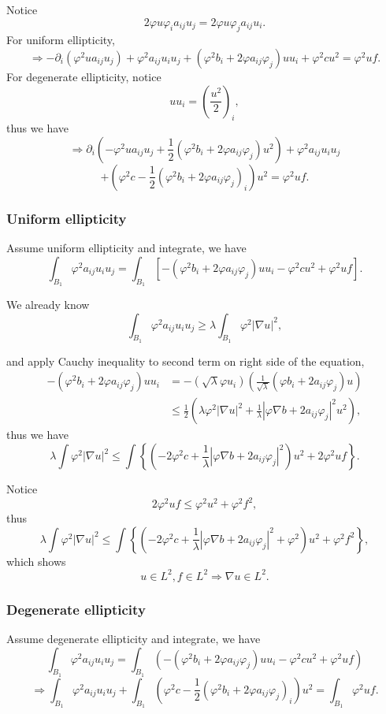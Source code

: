 \documentclass[12pt]{article}
\begin{document}
Notice
\[ 2\varphi u\varphi_ia_{ij}u_j=2\varphi u\varphi_ja_{ij}u_i. \]
For uniform ellipticity,
\[ \Rightarrow -\partial_i\left(\varphi^2ua_{ij}u_j\right)+\varphi^2a_{ij}u_iu_j + \left(\varphi^2b_i+2\varphi a_{ij}\varphi_j\right)uu_i+\varphi^2cu^2=\varphi^2uf. \]
For degenerate ellipticity, notice
\[ uu_i=\left(\frac{u^2}{2}\right)_i, \]
thus we have
\[ \Rightarrow \partial_i\left(-\varphi^2ua_{ij}u_j+\frac{1}{2}\left(\varphi^2b_i+2\varphi a_{ij}\varphi_j\right)u^2\right)+\varphi^2a_{ij}u_iu_j\]
\[+\left(\varphi^2c-\frac{1}{2}\left(\varphi^2b_i+2\varphi a_{ij}\varphi_j\right)_i\right)u^2=\varphi^2uf. \]

\subsubsection{Uniform ellipticity}
Assume uniform ellipticity and integrate, we have
\[ \int_{B_1}\varphi^2a_{ij}u_iu_j = \int_{B_1}\left[-\left(\varphi^2b_i+2\varphi a_{ij}\varphi_j\right)uu_i-\varphi^2cu^2+\varphi^2uf\right]. \]

We already know
\[ \int_{B_1}\varphi^2a_{ij}u_iu_j \ge \lambda \int_{B_1} \varphi^2|\nabla u|^2, \]

and apply Cauchy inequality to second term on right side of the equation,
\begin{align*}
-\left(\varphi^2b_i+2\varphi a_{ij}\varphi_j\right)uu_i &= -\left(\sqrt{\lambda} \varphi u_i \right)\left(\frac{1}{\sqrt{\lambda}}\left(\varphi b_i+2a_{ij}\varphi_j\right)u\right) \\
&\le \frac{1}{2}\left( \lambda \varphi^2 |\nabla u|^2 + \frac{1}{\lambda} |\varphi \nabla b + 2a_{ij}\varphi_j|^2u^2 \right),
\end{align*}
thus we have
\[
\lambda \int \varphi^2 |\nabla u|^2 \le \int \left\{ \left( -2\varphi^2c+\frac{1}{\lambda}|\varphi \nabla b + 2a_{ij}\varphi_j|^2 \right)u^2 + 2\varphi^2uf \right\}.
\]

Notice
\[ 2\varphi^2uf \le \varphi^2u^2+\varphi^2f^2, \]
thus
\[
\lambda \int \varphi^2 |\nabla u|^2 \le \int \left\{ \left( -2\varphi^2c+\frac{1}{\lambda}|\varphi \nabla b + 2a_{ij}\varphi_j|^2 +\varphi^2\right)u^2 + \varphi^2f^2 \right\},
\]
which shows
\[ u \in L^2, f\in L^2\Rightarrow \nabla u \in L^2. \]

\subsubsection{Degenerate ellipticity}
Assume degenerate ellipticity and integrate, we have
\[
\int_{B_1} \varphi^2 a_{ij}u_iu_j = \int_{B_1} \left(-\left(\varphi^2b_i+2\varphi a_{ij}\varphi_j\right)uu_i - \varphi^2cu^2+\varphi^2uf\right) \]
\[\Rightarrow 
\int_{B_1} \varphi^2 a_{ij}u_iu_j + \int_{B_1} \left(\varphi^2c-\frac{1}{2}\left(\varphi^2 b_i + 2\varphi a_{ij}\varphi_j\right)_i\right)u^2 = \int_{B_1} \varphi^2uf. 
\]
\end{document}
